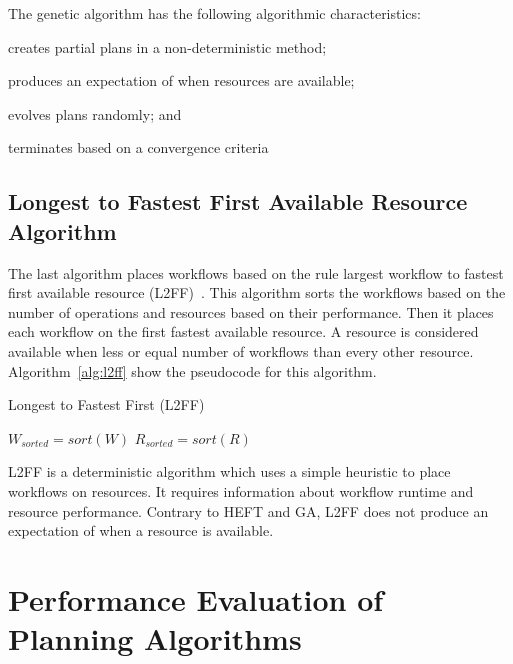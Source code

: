 The genetic algorithm has the following algorithmic characteristics:
\begin{inparaenum}[1)]
    \item creates partial plans in a non-deterministic method;
    \item produces an expectation of when resources are available;
    \item evolves plans randomly; and
    \item terminates based on a convergence criteria
\end{inparaenum}

\subsection{Longest to Fastest First Available Resource Algorithm}
\label{algo:l2ff}
The last algorithm places workflows based on the rule largest workflow to fastest first available resource (L2FF)~\cite{balasubramanian2019programming}.
This algorithm sorts the workflows based on the number of operations and resources based on their performance.
Then it places each workflow on the first fastest available resource.
A resource is considered available when less or equal number of workflows than every other resource.
Algorithm~\ref{alg:l2ff} show the pseudocode for this algorithm.

\begin{algorithm}[ht]
    \caption{Longest to Fastest First (L2FF)}
    \label{alg:l2ff}
    \begin{algorithmic}[1]
        \State \texttt{$W_{sorted}=sort(W)$} 
        \State \texttt{$R_{sorted}=sort(R)$}
        \EndFor
        \EndProcedure
    \end{algorithmic}
\end{algorithm}

L2FF is a deterministic algorithm which uses a simple heuristic to place workflows on resources.
It requires information about workflow runtime and resource performance.
Contrary to HEFT and GA, L2FF does not produce an expectation of when a resource is available.

\section{Performance Evaluation of Planning Algorithms}
\label{sec:algo_perf_comp}

